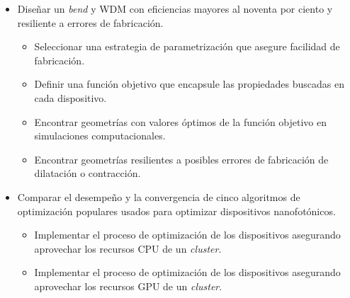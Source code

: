 \begin{itemize}

  \item Diseñar un \emph{bend} y WDM con eficiencias mayores al noventa por ciento y resiliente a errores de fabricación.

  \begin{itemize}

    \item Seleccionar una estrategia de parametrización que asegure facilidad de fabricación.

    \item Definir una función objetivo que encapsule las propiedades buscadas en cada dispositivo.

    \item Encontrar geometrías con valores óptimos de la función objetivo en simulaciones computacionales.

    \item Encontrar geometrías resilientes a posibles errores de fabricación de dilatación o contracción.

  \end{itemize}

  \item Comparar el desempeño y la convergencia de cinco algoritmos de optimización populares usados para optimizar dispositivos nanofotónicos.

  \begin{itemize}

    \item Implementar el proceso de optimización de los dispositivos asegurando aprovechar los
      recursos CPU de un \emph{cluster}.

    \item Implementar el proceso de optimización de los dispositivos asegurando aprovechar los
      recursos GPU de un \emph{cluster}.

  \end{itemize}

\end{itemize}





